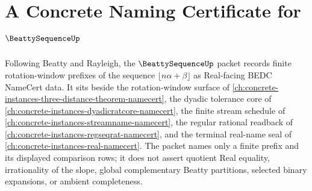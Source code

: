 \chapter{A Concrete Naming Certificate for $\BeattySequenceUp$}
\label{ch:concrete-instances-beatty-sequence-namecert}

Following Beatty and Rayleigh, the $\BeattySequenceUp$ packet records finite rotation-window prefixes of the sequence $\lfloor n\alpha+\beta\rfloor$ as Real-facing BEDC NameCert data. It sits beside the rotation-window surface of \autoref{ch:concrete-instances-three-distance-theorem-namecert}, the dyadic tolerance core of \autoref{ch:concrete-instances-dyadicratcore-namecert}, the finite stream schedule of \autoref{ch:concrete-instances-streamname-namecert}, the regular rational readback of \autoref{ch:concrete-instances-regseqrat-namecert}, and the terminal real-name seal of \autoref{ch:concrete-instances-real-namecert}. The packet names only a finite prefix and its displayed comparison rows; it does not assert quotient Real equality, irrationality of the slope, global complementary Beatty partitions, selected binary expansions, or ambient completeness.

